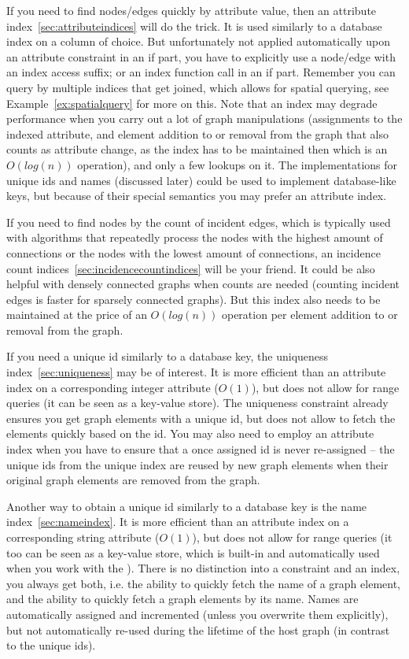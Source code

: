 If you need to find nodes/edges quickly by attribute value, then an attribute index~\ref{sec:attributeindices} will do the trick.
It is used similarly to a database index on a column of choice.
But unfortunately not applied automatically upon an attribute constraint in an if part, you have to explicitly use a node/edge with an index access suffix; or an index function call in an if part.
Remember you can query by multiple indices that get joined, which allows for spatial querying, see Example~\ref{ex:spatialquery} for more on this.
Note that an index may degrade performance when you carry out a lot of graph manipulations (assignments to the indexed attribute, and element addition to or removal from the graph that also counts as attribute change, as the index has to be maintained then which is an $O(log(n))$ operation), and only a few lookups on it.
The implementations for unique ids and names (discussed later) could be used to implement database-like keys, but because of their special semantics you may prefer an attribute index.

If you need to find nodes by the count of incident edges, which is typically used with algorithms that repeatedly process the nodes with the highest amount of connections or the nodes with the lowest amount of connections, an incidence count indices~\ref{sec:incidencecountindices} will be your friend.
It could be also helpful with densely connected graphs when counts are needed (counting incident edges is faster for sparsely connected graphs).
But this index also needs to be maintained at the price of an $O(log(n))$ operation per element addition to or removal from the graph.

If you need a unique id similarly to a database key, the uniqueness index~\ref{sec:uniqueness} may be of interest.
It is more efficient than an attribute index on a corresponding integer attribute ($O(1)$), but does not allow for range queries (it can be seen as a key-value store). The uniqueness constraint already ensures you get graph elements with a unique id, but does not allow to fetch the elements quickly based on the id. You may also need to employ an attribute index when you have to ensure that a once assigned id is never re-assigned -- the unique ids from the unique index are reused by new graph elements when their original graph elements are removed from the graph.

Another way to obtain a unique id similarly to a database key is the name index~\ref{sec:nameindex}.
It is more efficient than an attribute index on a corresponding string attribute ($O(1)$), but does not allow for range queries (it too can be seen as a key-value store, which is built-in and automatically used when you work with the \GrShell{}). There is no distinction into a constraint and an index, you always get both, i.e. the ability to quickly fetch the name of a graph element, and the ability to quickly fetch a graph elements by its name.
Names are automatically assigned and incremented (unless you overwrite them explicitly), but not automatically re-used during the lifetime of the host graph (in contrast to the unique ids).

